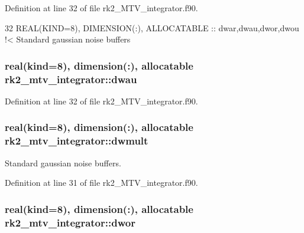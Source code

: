 Definition at line 32 of file rk2\+\_\+\+M\+T\+V\+\_\+integrator.\+f90.


\begin{DoxyCode}
32   \textcolor{keywordtype}{REAL(KIND=8)}, \textcolor{keywordtype}{DIMENSION(:)}, \textcolor{keywordtype}{ALLOCATABLE} :: dwar,dwau,dwor,dwou\textcolor{comment}{  !< Standard gaussian noise buffers}
\end{DoxyCode}
\subsubsection[{\texorpdfstring{dwau}{dwau}}]{\setlength{\rightskip}{0pt plus 5cm}real(kind=8), dimension(\+:), allocatable rk2\+\_\+mtv\+\_\+integrator\+::dwau\hspace{0.3cm}{\ttfamily [private]}}\hypertarget{namespacerk2__mtv__integrator_a00726f064d00787a9f02d960defbcf71}{}\label{namespacerk2__mtv__integrator_a00726f064d00787a9f02d960defbcf71}


Definition at line 32 of file rk2\+\_\+\+M\+T\+V\+\_\+integrator.\+f90.

\subsubsection[{\texorpdfstring{dwmult}{dwmult}}]{\setlength{\rightskip}{0pt plus 5cm}real(kind=8), dimension(\+:), allocatable rk2\+\_\+mtv\+\_\+integrator\+::dwmult\hspace{0.3cm}{\ttfamily [private]}}\hypertarget{namespacerk2__mtv__integrator_a00366eb109bd6df9f42317a1103b42d7}{}\label{namespacerk2__mtv__integrator_a00366eb109bd6df9f42317a1103b42d7}


Standard gaussian noise buffers. 



Definition at line 31 of file rk2\+\_\+\+M\+T\+V\+\_\+integrator.\+f90.

\subsubsection[{\texorpdfstring{dwor}{dwor}}]{\setlength{\rightskip}{0pt plus 5cm}real(kind=8), dimension(\+:), allocatable rk2\+\_\+mtv\+\_\+integrator\+::dwor\hspace{0.3cm}{\ttfamily [private]}}\hypertarget{namespacerk2__mtv__integrator_a1d35c3699f7164073c6c616117541e1c}{}\label{namespacerk2__mtv__integrator_a1d35c3699f7164073c6c616117541e1c}


